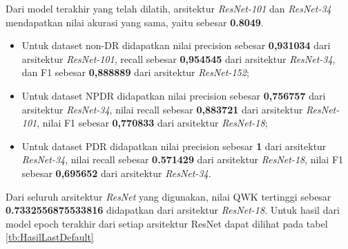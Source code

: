 Dari model terakhir yang telah dilatih, arsitektur \emph{ResNet-101} dan \emph{ResNet-34} mendapatkan nilai akurasi yang sama, yaitu sebesar \textbf{0.8049}.

\begin{itemize}
	
	\item Untuk dataset non-DR didapatkan nilai precision sebesar \textbf{0,931034} dari arsitektur \emph{ResNet-101}, recall sebesar \textbf{0,954545} dari arsitektur \emph{ResNet-34}, dan F1 sebesar \textbf{0,888889} dari arsitektur \emph{ResNet-152};
	
	\item Untuk dataset NPDR didapatkan nilai precision sebesar \textbf{0,756757} dari arsitektur \emph{ResNet-34}, nilai recall sebesar \textbf{0,883721} dari arsitektur \emph{ResNet-101}, nilai F1 sebesar \textbf{0,770833} dari arsitektur \emph{ResNet-18};
	
	\item Untuk dataset PDR didapatkan nilai precision sebesar \textbf{1} dari arsitektur \emph{ResNet-34}, nilai recall sebesar \textbf{0.571429} dari arsitektur \emph{ResNet-18}, nilai F1 sebesar \textbf{0,695652} dari arsitektur \emph{ResNet-34}.
	
\end{itemize}

Dari seluruh arsitektur \emph{ResNet} yang digunakan, nilai QWK tertinggi sebesar \textbf{0.7332556875533816} didapatkan dari arsitektur \emph{ResNet-18}. Untuk hasil dari model epoch terakhir dari setiap arsitektur ResNet dapat dilihat pada tabel \ref{tb:HasilLastDefault}
\pagebreak

